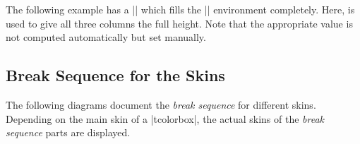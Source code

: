 The following example has a |\tcolorbox| which fills the |\multicols|
environment completely. Here,  is used
to give all three columns the full height.
Note that the appropriate  value is not computed
automatically but set manually.

\begin{dispListing}
\small
\begin{multicols}{3}
  \begin{tcolorbox}[enhanced jigsaw,breakable,size=small,
    colback=red!5!white,colframe=red!75!black,fonttitle=\bfseries,
    title=My breakable box,pad at break=2mm,drop fuzzy shadow,
    height fixed for=all, break at=11.4cm ]
  \lipsum[1-3]
  \end{tcolorbox}
\end{multicols}
\end{dispListing}
{\tcbusetemp}


\clearpage
\subsection{Break Sequence for the Skins}\label{subsec:breaksequence}
The following diagrams document the \emph{break sequence} for different
skins. Depending on the main skin of a |tcolorbox|, the actual skins of
the \emph{break sequence} parts are displayed.

\def\tcbbreakskininto#1#2#3#4#5{%
\begin{center}\begin{tikzpicture}
\tcbset{width=7cm,colframe=Navy,colback=AliceBlue,fonttitle=\bfseries,
  watermark color=AliceBlue!85!Navy,#5
  }
\node[above] (unbroken) at (0,0) {\begin{tcolorbox}[title=Unbroken Box,skin=#1,watermark text=unbroken,height=3.8cm]
\texttt{skin=#1}
\end{tcolorbox}};
\node[above] (first) at (8.7,2.4) {\begin{tcolorbox}[title=Broken Boxes,skin=#2,watermark text=first,height=1.4cm]
\texttt{skin=#2}
\end{tcolorbox}};
\node[above] (middle) at (8.7,1.2) {\begin{tcolorbox}[skin=#3,watermark text=middle,height=1cm]
\texttt{skin=#3}
\end{tcolorbox}};
\node[above] (last) at (8.7,0) {\begin{tcolorbox}[skin=#4,watermark text=last,height=1cm]
\texttt{skin=#4}
\end{tcolorbox}};
\path[draw=FireBrick,line width=2pt,->] (unbroken) edge (first.west) edge (middle.west) edge (last.west);
\end{tikzpicture}\end{center}}

